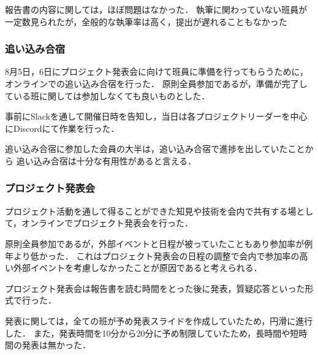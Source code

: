 報告書の内容に関しては，ほぼ問題はなかった．
執筆に関わっていない班員が一定数見られたが，全般的な執筆率は高く，提出が遅れることもなかった

\subsubsection*{追い込み合宿}
8月5日，6日にプロジェクト発表会に向けて班員に準備を行ってもらうために，オンラインでの追い込み合宿を行った．
原則全員参加であるが，準備が完了している班に関しては参加しなくても良いものとした．

事前にSlackを通して開催日時を告知し，当日は各プロジェクトリーダーを中心にDiscordにて作業を行った．

追い込み合宿に参加した会員の大半は，追い込み合宿で進捗を出していたことから
追い込み合宿は十分な有用性があると言える．

\subsubsection*{プロジェクト発表会}
プロジェクト活動を通して得ることができた知見や技術を会内で共有する場として，オンラインでプロジェクト発表会を行った．

原則全員参加であるが，外部イベントと日程が被っていたこともあり参加率が例年より低かった．
これはプロジェクト発表会の日程の調整で会内で参加率の高い外部イベントを考慮しなかったことが原因であると考えられる．

プロジェクト発表会は報告書を読む時間をとった後に発表，質疑応答といった形式で行った．

発表に関しては，全ての班が予め発表スライドを作成していたため，円滑に進行した．
また，発表時間を10分から20分に予め制限していたため，長時間や短時間の発表は無かった．
